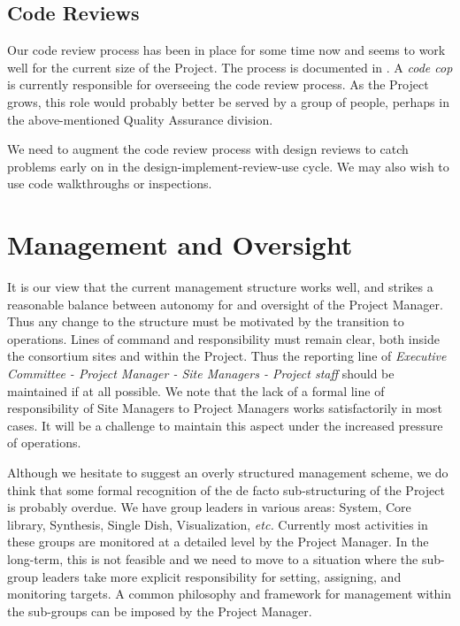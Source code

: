 \subsection{Code Reviews}

Our code review process has been in place for some time now and seems to work
well for the current size of the Project. The process is documented in 
.
A {\em code cop} is currently responsible for overseeing the code review
process. As the Project grows, this role would probably better be served
by a group of people, perhaps in the above-mentioned Quality Assurance division.

We need to augment the code review process with design reviews to catch
problems early on in the design-implement-review-use cycle. We may also
wish to use code walkthroughs or inspections.

\section{Management and Oversight}

It is our view that the current management structure works well, and
strikes a reasonable balance between autonomy for and oversight of the
Project Manager. Thus any change to the structure must be motivated by
the transition to operations. Lines of command and responsibility
must remain clear, both inside the consortium sites and within the
Project. Thus the reporting line of {\em Executive Committee - Project
Manager - Site Managers - Project staff} should be maintained if at
all possible. We note that the lack of a formal line of responsibility
of Site Managers to Project Managers works satisfactorily in most cases.
It will be a challenge to maintain this aspect under the increased
pressure of operations.

Although we hesitate to suggest an overly structured management
scheme, we do think that some formal recognition of the de facto
sub-structuring of the Project is probably overdue. We have group
leaders in various areas: System, Core library, Synthesis, Single
Dish, Visualization, {\em etc.} Currently most activities in these
groups are monitored at a detailed level by the Project Manager. In
the long-term, this is not feasible and we need to move to a situation
where the sub-group leaders take more explicit responsibility for
setting, assigning, and monitoring targets. A common philosophy and
framework for management within the sub-groups can be imposed by the
Project Manager.

